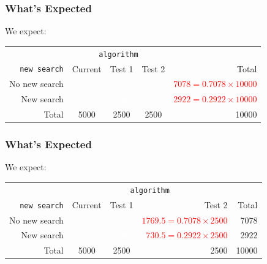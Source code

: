 \documentclass[slides]{beamer}
\newcommand{\white}[1]{\textcolor{white}{#1}}
\newcommand{\red}[1]{\textcolor{red}{#1}}
\begin{document}
\begin{frame}
\frametitle{What's Expected}

We expect:
\begin{center}
  \begin{tabular}{r|ccc|r}
& \multicolumn{3}{c|}{{\tt algorithm}} & \\
       {\tt new search} & Current & Test 1 & Test 2 & Total \\ 
\hline
    No new search & \white{4000} & \white{2000} & \white{2000} & \red{$7078 = 0.7078 \times 10000$} \\ 
    New search & \white{1000} & \white{500} & \white{500} & \red{$2922 = 0.2922 \times 10000$} \\ 
\hline
    Total & 5000 & 2500 & 2500 & 10000 \\ 
  \end{tabular}
\end{center}


\end{frame}


\begin{frame}
\frametitle{What's Expected}

We expect:
\begin{center}
  \begin{tabular}{r|ccr|r}
& \multicolumn{3}{c|}{{\tt algorithm}} & \\
       {\tt new search} & Current & Test 1 & Test 2 & Total \\ 
\hline
    No new search & \white{4000} & \white{2000} & \red{$1769.5=0.7078 \times 2500$} & 7078 \\ 
    New search & \white{1000} & \white{500} & \red{$730.5=0.2922 \times 2500$} & 2922 \\ 
\hline
    Total & 5000 & 2500 & 2500 & 10000 \\ 
  \end{tabular}
\end{center}


\end{frame}
\end{document}

